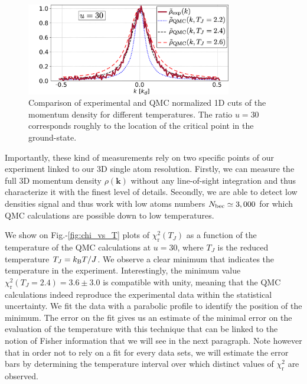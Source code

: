 \begin{figure}
    \centering
    \includegraphics[width=0.8\textwidth]{Fig/Chapter3/comp_qmc.png}
    \caption[Comparison of experimental and QMC normalized 1D cuts of the momentum density for different temperatures]{Comparison of experimental and QMC normalized 1D cuts of the momentum density for different temperatures. The ratio $u=30$ corresponds roughly to the location of the critical point in the ground-state.}
    \label{fig:comp_qmc}
\end{figure}

Importantly, these kind of measurements rely on two specific points of our experiment linked to our 3D single atom resolution. Firstly, we can measure the full 3D momentum density $\rho(\bm{k})$ without any line-of-sight integration and thus characterize it with the finest level of details. Secondly, we are able to detect low densities signal and thus work with low atoms numbers $N_{\rm{bec}} \simeq 3,000$ for which QMC calculations are possible down to low temperatures.

We show on Fig.-\ref{fig:chi_vs_T} plots of $\chi_{\mathrm{r}}^{2}(T_J)$ as a function of the temperature of the QMC calculations at $u=30$, where $T_J$ is the reduced temperature $T_J = k_{\mathrm{B}} T /J$. We observe a clear minimum that indicates the temperature in the experiment. Interestingly, the minimum value $\chi_{\mathrm{r}}^{2}\left(T_{J}=2.4\right)=3.6 \pm 3.0$ is compatible with unity, meaning that the QMC calculations indeed reproduce the experimental data within the statistical uncertainty. We fit the data with a parabolic profile to identify the position of the minimum. The error on the fit gives us an estimate of the minimal error on the evaluation of the temperature with this technique that can be linked to the notion of Fisher information that we will see in the next paragraph. Note however that in order not to rely on a fit for every data sets, we will estimate the error bars by determining the temperature interval over which distinct values of $\chi_{\mathrm{r}}^{2}$ are observed.

